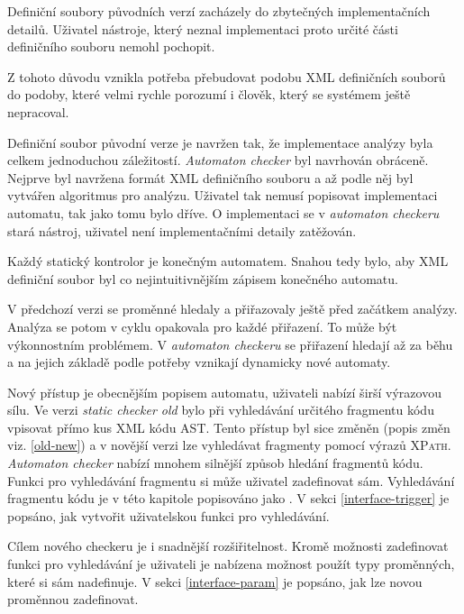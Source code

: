 \documentclass[11pt,final,oneside]{fithesis}
\begin{document}
Definiční soubory původních verzí zacházely do zbytečných implementačních detailů. Uživatel nástroje, který neznal implementaci proto určité části definičního souboru nemohl pochopit.

Z tohoto důvodu vznikla potřeba přebudovat podobu XML definičních souborů do podoby, které velmi rychle porozumí i člověk, který se systémem ještě nepracoval.

Definiční soubor původní verze je navržen tak, že implementace analýzy byla celkem jednoduchou záležitostí. \textit{Automaton checker} byl navrhován obráceně. Nejprve byl navržena formát XML definičního souboru a až podle něj byl vytvářen algoritmus pro analýzu. Uživatel tak nemusí popisovat implementaci automatu, tak jako tomu bylo dříve. O implementaci se v \textit{automaton checkeru} stará nástroj, uživatel není implementačními detaily zatěžován.

Každý statický kontrolor je konečným automatem\cite{aag}. Snahou tedy bylo, aby XML definiční soubor byl co nejintuitivnějším zápisem konečného automatu.

V předchozí verzi se proměnné hledaly a přiřazovaly ještě před začátkem analýzy. Analýza se potom v cyklu opakovala pro každé přiřazení. To může být výkonnostním problémem. V \textit{automaton checkeru} se přiřazení hledají až za běhu a na jejich základě podle potřeby vznikají dynamicky nové automaty.

Nový přístup je obecnějším popisem automatu, uživateli nabízí širší výrazovou sílu. Ve verzi \textit{static checker old} bylo při vyhledávání určitého fragmentu kódu vpisovat přímo kus XML kódu AST. Tento přístup byl sice změněn (popis změn viz. \ref{old-new}) a v novější verzi lze vyhledávat fragmenty pomocí výrazů \textsc{XPath}. \textit{Automaton checker} nabízí mnohem silnější způsob hledání fragmentů kódu. Funkci pro vyhledávání fragmentu si může uživatel zadefinovat sám. Vyhledávání fragmentu kódu je v této kapitole popisováno jako . V sekci \ref{interface-trigger} je popsáno, jak vytvořit uživatelskou funkci pro vyhledávání.

Cílem nového checkeru je i snadnější rozšiřitelnost. Kromě možnosti zadefinovat funkci pro vyhledávání je uživateli je nabízena možnost použít typy proměnných, které si sám nadefinuje. V sekci \ref{interface-param} je popsáno, jak lze novou proměnnou zadefinovat.


\end{document}
